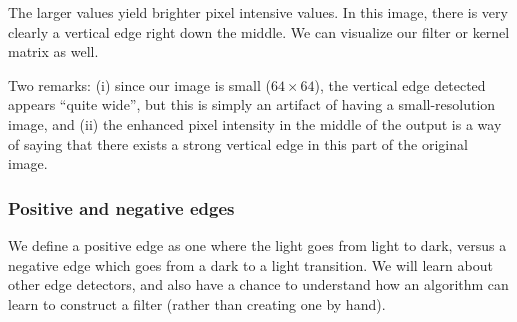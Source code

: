 \documentclass[12pt]{article}
\begin{document}
\begin{figure}[h]   
  \centering
\end{figure} 
The larger values yield brighter pixel intensive values. In this image, there is very clearly a vertical edge right down the middle.
We can visualize our filter or kernel matrix as well.
\begin{figure}[h]
  \centering
   \end{figure}

Two remarks: (i) since our image is small ($64 \times 64$), the vertical edge detected appears ``quite wide'', but this is simply
an artifact of having a small-resolution image, and (ii) the enhanced pixel intensity in the middle of the output is a way of
saying that there exists a strong vertical edge in this part of the original image.

\subsubsection{Positive and negative edges} 
We define a positive edge as one where the light goes from light to dark, versus a negative edge
which goes from a dark to a light transition. We will learn about other edge detectors, and also have a chance to understand
how an algorithm can learn to construct a filter (rather than creating one by hand).
\end{document}
